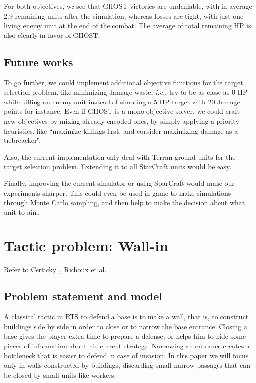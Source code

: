 \documentclass[journal]{IEEEtran}
\newcommand{\ghost}{\textsc{GHOST}\xspace}
\newcommand{\ie}{\textit{i.e.}}
\begin{document}
For both objectives, we see that \ghost victories are undeniable, with
in average  2.9 remaining units  after the simulation,  whereas losses
are  tight,  with  just one  living  enemy  unit  at  the end  of  the
combat. The average of total remaining  HP is also clearly in favor of
\ghost.

\subsection{Future works}

To go further,  we could implement additional  objective functions for
the target selection  problem, like minimizing damage  waste, \ie, try
to be as close as 0 HP while killing an enemy unit instead of shooting
a 5-HP target with 20 damage points  for instance. Even if \ghost is a
mono-objective solver, we could craft new objectives by mixing already
encoded  ones,   by  simply  applying  a   priority  heuristics,  like
``maximize  killings  first,  and  consider  maximizing  damage  as  a
tiebreacker''.

Also, the  current implementation only  deal with Terran  ground units
for the target selection problem.  Extending it to all StarCraft units
would be easy.

Finally, improving the current simulator or using SparCraft would make
our  experiments sharper.   This could  even be  used in-game  to make
simulations through  Monte Carlo sampling,  and then help to  make the
decision about what unit to aim.

\section{Tactic problem: Wall-in}\label{sec:wall}
Refer to Certicky~\cite{Certicky13}, Richoux et al.~\cite{RichouxUO14}
\subsection{Problem statement and model}

A classical tactic in RTS to defend a base is to make a wall, that is,
to construct buildings side by side in order to close or to narrow the
base entrance. Closing a base gives the player extra-time to prepare a
defense, or  helps him to  hide some  pieces of information  about his
current strategy. Narrowing  an entrance creates a  bottleneck that is
easier to defend in case of invasion. In this paper we will focus only
in walls  constructed by  buildings, discarding small  narrow passages
that can be closed by small units like workers.
\end{document}
